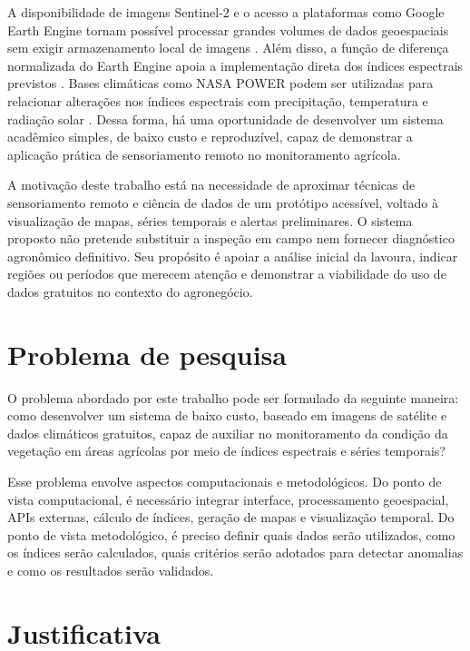A disponibilidade de imagens Sentinel-2 e o acesso a plataformas como Google Earth Engine tornam possível processar grandes volumes de dados geoespaciais sem exigir armazenamento local de imagens \citep{GOOGLE_S2_SR}. Além disso, a função de diferença normalizada do Earth Engine apoia a implementação direta dos índices espectrais previstos \citep{GOOGLE_EE_ND}. Bases climáticas como NASA POWER podem ser utilizadas para relacionar alterações nos índices espectrais com precipitação, temperatura e radiação solar \citep{NASA_POWER_DAILY}. Dessa forma, há uma oportunidade de desenvolver um sistema acadêmico simples, de baixo custo e reproduzível, capaz de demonstrar a aplicação prática de sensoriamento remoto no monitoramento agrícola.

A motivação deste trabalho está na necessidade de aproximar técnicas de sensoriamento remoto e ciência de dados de um protótipo acessível, voltado à visualização de mapas, séries temporais e alertas preliminares. O sistema proposto não pretende substituir a inspeção em campo nem fornecer diagnóstico agronômico definitivo. Seu propósito é apoiar a análise inicial da lavoura, indicar regiões ou períodos que merecem atenção e demonstrar a viabilidade do uso de dados gratuitos no contexto do agronegócio.

\section{Problema de pesquisa}

O problema abordado por este trabalho pode ser formulado da seguinte maneira: como desenvolver um sistema de baixo custo, baseado em imagens de satélite e dados climáticos gratuitos, capaz de auxiliar no monitoramento da condição da vegetação em áreas agrícolas por meio de índices espectrais e séries temporais?

Esse problema envolve aspectos computacionais e metodológicos. Do ponto de vista computacional, é necessário integrar interface, processamento geoespacial, APIs externas, cálculo de índices, geração de mapas e visualização temporal. Do ponto de vista metodológico, é preciso definir quais dados serão utilizados, como os índices serão calculados, quais critérios serão adotados para detectar anomalias e como os resultados serão validados.

\section{Justificativa}

